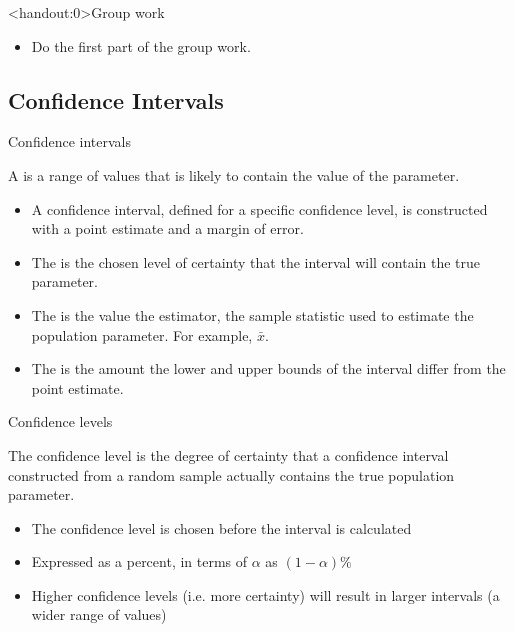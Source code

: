 \documentclass[xcolor=table, aspectratio=169, bigger, handout]{beamer}
\begin{document}
\begin{frame}<handout:0>{Group work}
\begin{block}{}
\large
\begin{itemize}
\item Do the first part of the group work.
\end{itemize}
\end{block}
\end{frame}

%
%
\subsection{Confidence Intervals}

\begin{frame}{Confidence intervals}
\begin{block}{}
A  is a range of values that is likely to contain the value of the parameter.

\begin{itemize}
\item A confidence interval, defined for a specific confidence level, is constructed with a point estimate and a margin of error.
\item  The  is the chosen level of certainty that the interval will contain the true parameter. 
\item The  is the value the estimator, the sample statistic used to estimate the population parameter. For example, $\bar x$.
\item The  is the amount the lower and upper bounds of the interval differ from the point estimate.
\end{itemize}
\end{block}
\end{frame}

\begin{frame}{Confidence levels}

\begin{block}{}
The confidence level is the degree of certainty that a confidence interval constructed from a random sample actually contains the true population parameter.\\
\begin{itemize}
\pause\item The confidence level is chosen before the interval is calculated
\pause\item Expressed as a percent, in terms of $\alpha$ as $(1-\alpha)\%$
\pause\item Higher confidence levels (i.e. more certainty) will result in larger intervals (a wider range of values)
\end{itemize} 
\end{block}

\end{frame}
\end{document}
